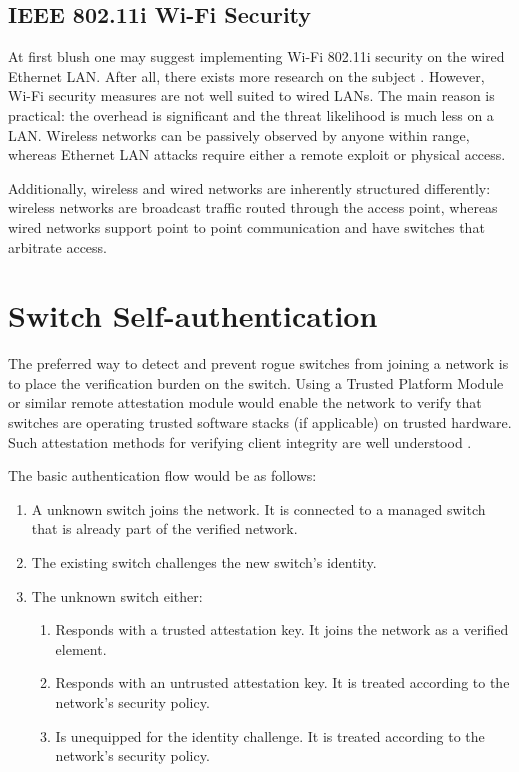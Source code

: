 \documentclass[journal]{IEEEtran}
\begin{document}
\subsection{IEEE 802.11i Wi-Fi Security}
At first blush one may suggest implementing Wi-Fi 802.11i security on the wired Ethernet LAN. After
all, there exists more research on the subject \cite{b4}\cite{b5}. However, Wi-Fi security measures
are not well suited to wired LANs. The main reason is practical: the overhead is significant and
the threat likelihood is much less on a LAN. Wireless networks can be passively observed by anyone
within range, whereas Ethernet LAN attacks require either a remote exploit or physical access.

Additionally, wireless and wired networks are inherently structured differently: wireless networks
are broadcast traffic routed through the access point, whereas wired networks support point to
point communication and have switches that arbitrate access.



\section{Switch Self-authentication}
The preferred way to detect and prevent rogue switches from joining a network is to place the
verification burden on the switch. Using a Trusted Platform Module or similar remote attestation
module would enable the network to verify that switches are operating trusted software stacks (if
applicable) on trusted hardware. Such attestation methods for verifying client integrity are well
understood \cite{b6}.

The basic authentication flow would be as follows:
\begin{enumerate}
  \item A unknown switch joins the network. It is connected to a managed switch that is already
  part of the verified network.
  \item The existing switch challenges the new switch's identity.
  \item The unknown switch either:
  \begin{enumerate}
    \item Responds with a trusted attestation key. It joins the network as a verified element.
    \item Responds with an untrusted attestation key. It is treated according to the network's
    security policy.
    \item Is unequipped for the identity challenge. It is treated according to the network's
    security policy.
  \end{enumerate}
\end{enumerate}
\end{document}

